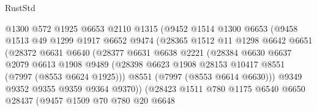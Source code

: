 \begin{lexlean}{RustStd}
\begin{coremodule}
                          @1300
                          @572
                          @1925
                          @6653
                          @2110
                          @1315
                          (@9452
                            @1514
                            @1300
                            @6653
                            (@9458
                              @1513
                              @49
                              @1299
                              @1917
                              @6652
                              @9474
                              (@28365
                                @1512
                                @11
                                @1298
                                @6642
                                @6651
                                (@28372
                                  @6631
                                  @6640
                                  (@28377
                                    @6631
                                    @6638
                                    @2221
                                    (@28384
                                      @6630
                                      @6637
                                      @2079
                                      @6613
                                      @1908
                                      @9489
                                      (@28398
                                        @6623
                                        @1908
                                        @28153
                                        @10417
                                        @8551
                                        (@7997 (@8553 @6624 @1925)))
                                      @8551
                                      (@7997 (@8553 @6614 @6630)))
                                    @9349
                                    @9352
                                    @9355
                                    @9359
                                    @9364
                                    @9370))
                                (@28423
                                  @1511
                                  @780
                                  @1175
                                  @6540
                                  @6650
                                  @28437
                                  (@9457
                                    @1509
                                    @70
                                    @780
                                    @20
                                    @6648

\end{coremodule}
\end{lexlean}
